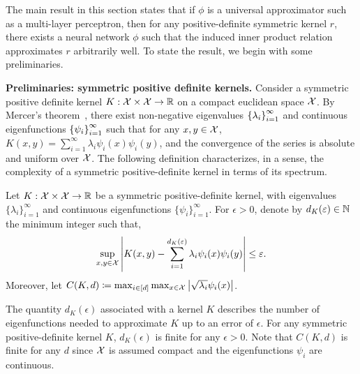 The main result in this section states that if $\phi$ is a universal approximator such as a multi-layer perceptron, then for any positive-definite symmetric kernel $r$, there exists a neural network $\phi$ such that the induced inner product relation approximates $r$ arbitrarily well. To state the result, we begin with some preliminaries.

\textbf{Preliminaries: symmetric positive definite kernels.} Consider a symmetric positive definite kernel $K: {\mathcal{X}} \times {\mathcal{X}} \to \mathbb{R}$ on a compact euclidean space ${\mathcal{X}}$. By Mercer's theorem~\parencite{mercerFunctionsPositive1909, sunMercerTheorem2005, micchelliUniversalKernels2006}, there exist non-negative eigenvalues $\left\{\lambda_i\right\}_{i=1}^{\infty}$ and continuous eigenfunctions $\left\{\psi_i\right\}_{i=1}^{\infty}$ such that for any $x,y \in {\mathcal{X}}$, $K(x, y) = \sum_{i=1}^\infty \lambda_i \psi_i(x) \psi_i(y)$, and the convergence of the series is absolute and uniform over ${\mathcal{X}}$. The following definition characterizes, in a sense, the complexity of a symmetric positive-definite kernel in terms of its spectrum.

\begin{assumption}\label{ass:sym_pd_ker_specturm_decay}
	Let $K: {\mathcal{X}} \times {\mathcal{X}} \to \mathbb{R}$ be a symmetric positive-definite kernel, with eigenvalues $\{\lambda_i\}_{i=1}^{\infty}$ and continuous eigenfunctions $\{\psi_i\}_{i=1}^{\infty}$. For $\epsilon > 0$, denote by $d_K(\varepsilon) \in \mathbb{N}$ the minimum integer such that,
	\begin{equation*}
		\sup_{x, y \in \calX} \abs{K(x, y) - \sum_{i=1}^{d_K(\epsilon)} \lambda_i \psi_i(x) \psi_i(y)} \leq \epsilon.
	\end{equation*}
	Moreover, let $C(K, d) \coloneq \max_{i \in [d]} \max_{x \in {\mathcal{X}}} \left\lvert\sqrt{\lambda_i} \psi_i(x)\right\rvert$.%
\end{assumption}

The quantity $d_K(\epsilon)$ associated with a kernel $K$ describes the number of eigenfunctions needed to approximate $K$ up to an error of $\epsilon$. For any symmetric positive-definite kernel $K$, $d_K(\epsilon)$ is finite for any $\epsilon > 0$. 
Note that $C(K, d)$ is finite for any $d$ since ${\mathcal{X}}$ is assumed compact and the eigenfunctions $\psi_i$ are continuous. %

